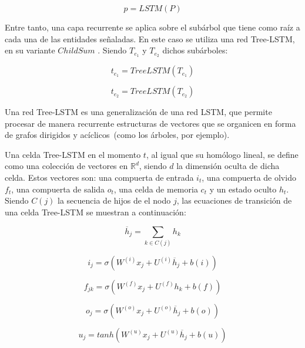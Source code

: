 \begin{equation*}
p = LSTM(P)
\end{equation*}

Entre tanto, una capa recurrente se aplica sobre el subárbol que tiene como raíz a cada una de las entidades señaladas.
En este caso se utiliza una red Tree-LSTM, en su variante $Child Sum$ \cite{treeLSTM}.
Siendo $T_{e_1}$ y $T_{e_2}$ dichos subárboles:

\begin{equation*}
	t_{e_1} = TreeLSTM(T_{e_1})
\end{equation*}


\begin{equation*}
	t_{e_2} = TreeLSTM(T_{e_2})
\end{equation*}


Una red Tree-LSTM es una generalización de una red LSTM, que permite procesar de manera recurrente estructuras de vectores que se organicen en forma de grafos dirigidos y acíclicos~(como los árboles, por ejemplo). 

Una celda Tree-LSTM en el momento $t$, al igual que su homólogo lineal, se define como una colección de vectores en $\mathbb{R}^d$, siendo $d$ la dimensión oculta de dicha celda.
Estos vectores son: una compuerta de entrada $i_t$, una compuerta de olvido $f_t$, una compuerta de salida $o_t$, una celda de memoria $c_t$ y un estado oculto $h_t$. Siendo $C(j)$ la secuencia de hijos de el nodo $j$, las ecuaciones de transición de una celda Tree-LSTM se muestran a continuación:

\begin{equation*}
	\overline{h}_j = \sum_{k\in C(j)} h_k
\end{equation*}

\begin{equation*}
i_j = \sigma(W^{(i)}x_j + U^{(i)}\overline{h}_j + b(i))
\end{equation*}

\begin{equation*}
f_{jk} = \sigma(W^{(f)}x_j + U^{(f)}h_k + b(f))
\end{equation*}

\begin{equation*}
o_j = \sigma(W^{(o)}x_j + U^{(o)}\overline{h}_j + b(o))
\end{equation*}

\begin{equation*}
u_j = tanh(W^{(u)}x_j + U^{(u)}\overline{h}_j + b(u))
\end{equation*}

